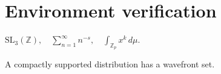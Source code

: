 \documentclass[11pt,oneside]{book}
\begin{document}
\chapter{Environment verification}
 \(\mathrm{SL}_3(\mathbb Z),\quad
\sum_{n=1}^{\infty}n^{-s},\quad\int_{\mathbb Z_p}x^k\,d\mu.\)
\begin{proposition}
A compactly supported distribution has a wavefront set.
\end{proposition}
\end{document}
